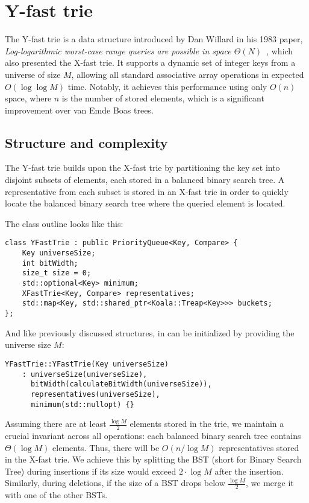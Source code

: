 \section{Y-fast trie}

The Y-fast trie is a data structure introduced by Dan Willard in his 1983 paper, \emph{Log-logarithmic worst-case range queries are possible in space \( \Theta(N) \)}~\cite{Willard1983}, which also presented the X-fast trie. It supports a dynamic set of integer keys from a universe of size \( M \), allowing all standard associative array operations in expected \( O(\log \log M) \) time. Notably, it achieves this performance using only \( O(n) \) space, where \( n \) is the number of stored elements, which is a significant improvement over van Emde Boas trees.

\subsection{Structure and complexity}

The Y-fast trie builds upon the X-fast trie by partitioning the key set into disjoint subsets of elements, each stored in a balanced binary search tree. A representative from each subset is stored in an X-fast trie in order to quickly locate the balanced binary search tree where the queried element is located.

The class outline looks like this:
\begin{verbatim}
class YFastTrie : public PriorityQueue<Key, Compare> {
    Key universeSize;
    int bitWidth;
    size_t size = 0;
    std::optional<Key> minimum;
    XFastTrie<Key, Compare> representatives;
    std::map<Key, std::shared_ptr<Koala::Treap<Key>>> buckets;
};
\end{verbatim}

And like previously discussed structures, in can be initialized by providing the universe size \(M\):

\begin{verbatim}
YFastTrie::YFastTrie(Key universeSize)
    : universeSize(universeSize),
      bitWidth(calculateBitWidth(universeSize)),
      representatives(universeSize),
      minimum(std::nullopt) {}
\end{verbatim}

Assuming there are at least \( \frac{\log M}{2} \) elements stored in the trie, we maintain a crucial invariant across all operations: each balanced binary search tree contains \( \Theta(\log M) \) elements. Thus, there will be \( O(n / \log M) \) representatives stored in the X-fast trie. We achieve this by splitting the BST (short for Binary Search Tree) during insertions if its size would exceed \( 2 \cdot \log M \) after the insertion. Similarly, during deletions, if the size of a BST drops below \( \frac{\log M}{2} \), we merge it with one of the other BSTs. 

